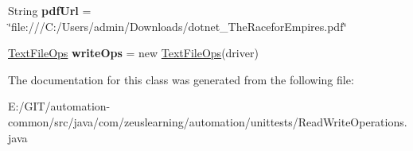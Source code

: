 \begin{DoxyCompactItemize}
\item 
\hypertarget{classcom_1_1zeuslearning_1_1automation_1_1unittests_1_1ReadWriteOperations_a7243220823e1ea8d310256bd43988c61}{}\label{classcom_1_1zeuslearning_1_1automation_1_1unittests_1_1ReadWriteOperations_a7243220823e1ea8d310256bd43988c61} 
String {\bfseries pdf\+Url} = \char`\"{}file\+:///C\+:/Users/admin/Downloads/dotnet\+\_\+\+The\+Racefor\+Empires.\+pdf\char`\"{}
\item 
\hypertarget{classcom_1_1zeuslearning_1_1automation_1_1unittests_1_1ReadWriteOperations_a18275f8900d51c619d89b6d157847b26}{}\label{classcom_1_1zeuslearning_1_1automation_1_1unittests_1_1ReadWriteOperations_a18275f8900d51c619d89b6d157847b26} 
\hyperlink{classcom_1_1zeuslearning_1_1automation_1_1io_1_1TextFileOps}{Text\+File\+Ops} {\bfseries write\+Ops} = new \hyperlink{classcom_1_1zeuslearning_1_1automation_1_1io_1_1TextFileOps}{Text\+File\+Ops}(driver)
\end{DoxyCompactItemize}


The documentation for this class was generated from the following file\+:\begin{DoxyCompactItemize}
\item 
E\+:/\+G\+I\+T/automation-\/common/src/java/com/zeuslearning/automation/unittests/Read\+Write\+Operations.\+java\end{DoxyCompactItemize}
